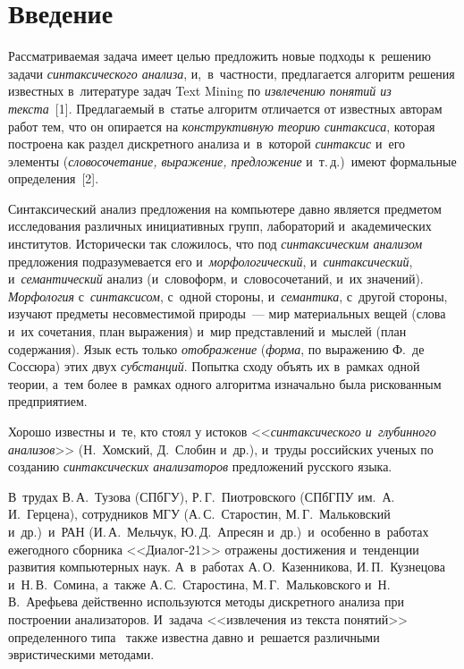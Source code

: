 \thispagestyle{headings}

\begin{multicols}{2}

\label{st\stat}
     
\section{Введение}

\vspace*{-3pt}

     Рассматриваемая задача имеет целью предложить новые подходы 
к~решению задачи \textit{синтаксического анализа}, и,~в~част\-ности, 
предлагается алгоритм решения известных в~литературе задач Text Mining по 
\textit{извлечению понятий из текста}~[1]. Предлагаемый в~статье алгоритм 
отличается от известных авторам работ тем, что он опирается на 
\textit{конструктивную тео\-рию синтаксиса}, которая построена как раздел 
дискретного анализа и~в~которой \textit{синтаксис} и~его элементы 
(\textit{словосочетание, выражение, предложение} и~т.\,д.)\ имеют формальные 
определения~[2].
     
     Синтаксический анализ предложения на компьютере давно является 
предметом исследования различных инициативных групп, лабораторий 
и~академических институтов. Исторически так сложилось, что под 
\textit{синтаксическим анализом} предложения подразумевается его 
и~\textit{морфологический}, и~\textit{синтаксический}, и~\textit{семантический} 
анализ (и~словоформ, и~словосочетаний, и~их значений). \textit{Морфология} 
с~\textit{синтаксисом}, с~одной стороны, и~\textit{семантика}, с~другой стороны, 
изучают предметы несовместимой природы~--- мир материальных вещей (слова 
и~их сочетания, план выражения) и~мир пред\-став\-ле\-ний и~мыслей (план 
содержания). Язык есть только \textit{отображение} (\textit{форма}, по 
выражению Ф.~де Соссюра) этих двух \textit{субстанций}. Попытка сходу объять 
их в~рамках одной тео\-рии, а~тем более в~рам\-ках одного алгоритма изначально 
была рискованным предприятием. 
     
     Хорошо известны и~те, кто стоял у истоков <<\textit{синтаксического 
и~глубинного анализов}>> (Н.~Хомский, Д.~Слобин и~др.), и~труды российских 
ученых по созданию \textit{синтаксических анализаторов} предложений русского 
языка. 

В~трудах В.\,А.~Тузова (СПбГУ), Р.\,Г.~Пиотровского (СПбГПУ им.\ 
А.\,И.~Герцена), сотрудников МГУ 
(А.\,С.~Старостин, М.\,Г.~Мальковский и~др.)\ и~РАН (И.\,А.~Мельчук, 
Ю.\,Д.~Апресян и~др.)\ и~особенно в~работах ежегодного 
сборника <<Диалог-21>> отражены достижения и~тенденции развития 
компьютерных наук. А~в~работах А.\,О.~Казенникова, И.\,П.~Кузнецова 
и~Н.\,В.~Сомина, а~так\-же А.\,С.~Старостина, М.\,Г.~Мальковского 
и~Н.\,В.~Арефь\-ева действенно используются методы дискретного анализа при 
построении анализаторов. И~задача <<извлечения из текс\-та понятий>> 
определенного типа~\cite{3-mir} так\-же известна дав\-но и~решается различными 
эвристическими методами.
     

\end{multicols}
